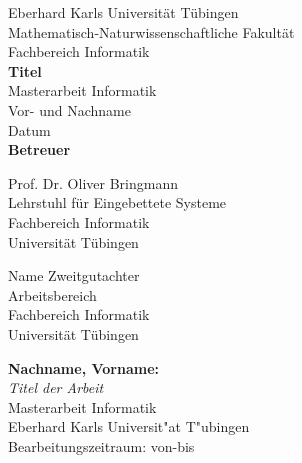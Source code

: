 \documentclass[12pt,a4paper]{report}
\begin{document}

\begin{titlepage}
 \begin{center}
  {\LARGE Eberhard Karls Universität Tübingen}\\
  {\large Mathematisch-Naturwissenschaftliche Fakultät\\
  Fachbereich Informatik\\[2cm]}
  {\Huge\bf  Titel\\[1.5cm]}
  {\Large Masterarbeit Informatik\\[3.5cm]}
  {\Large Vor- und Nachname}\\[0.5cm]
  Datum\\[4cm]
{\small\bf Betreuer}\\[0.5cm]
  \parbox{7cm}{\begin{center}{
  	\large Prof. Dr. Oliver Bringmann}\\
	  Lehrstuhl für Eingebettete Systeme\\
	  Fachbereich Informatik\\
	  Universität Tübingen
	  \end{center}}\hfill\parbox{7cm}{\begin{center}
  {\large Name Zweitgutachter}\\
	  Arbeitsbereich\\
	  Fachbereich Informatik\\
	  Universität Tübingen \end{center}
 }
  \end{center}
\end{titlepage}


\thispagestyle{empty}
\vspace*{\fill}
\begin{minipage}{11.2cm}
\textbf{Nachname, Vorname:}\\
\emph{Titel der Arbeit}\\ Masterarbeit Informatik\\
Eberhard Karls Universit"at T"ubingen\\
Bearbeitungszeitraum: von-bis
\end{minipage}
\newpage
\end{document}
